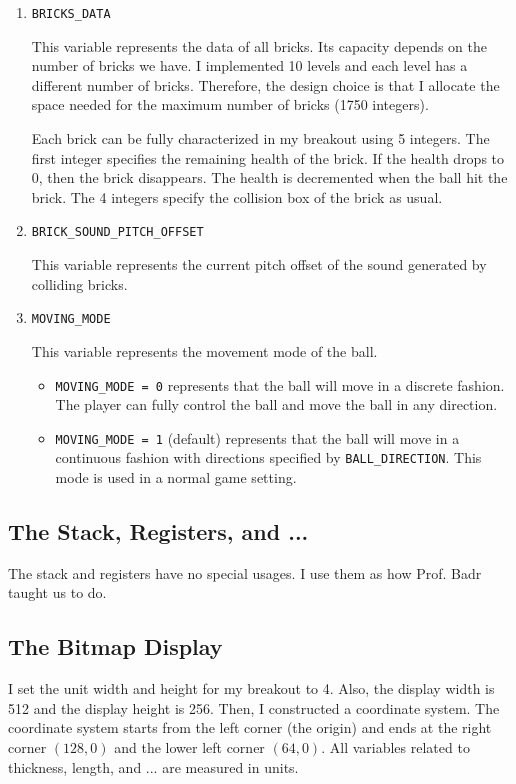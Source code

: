 \documentclass{article}
\newcommand{\code}[1]{\texttt{#1}}
\begin{document}
\begin{enumerate}
\item \code{BRICKS\_DATA}

This variable represents the data of all bricks. Its capacity depends on the number of bricks we have. I implemented 10 levels and each level has a different number of bricks. Therefore, the design choice is that I allocate the space needed for the maximum number of bricks (1750 integers).

Each brick can be fully characterized in my breakout using 5 integers. The first integer specifies the remaining health of the brick. If the health drops to 0, then the brick disappears. The health is decremented when the ball hit the brick. The 4 integers specify the collision box of the brick as usual.

\item \code{BRICK\_SOUND\_PITCH\_OFFSET}

This variable represents the current pitch offset of the sound generated by colliding bricks.

\item \code{MOVING\_MODE}

This variable represents the movement mode of the ball. 

\begin{itemize}
    \item \code{MOVING\_MODE = 0} represents that the ball will move in a discrete fashion. The player can fully control the ball and move the ball in any direction.
    \item \code{MOVING\_MODE = 1} (default) represents that the ball will move in a continuous fashion with directions specified by \code{BALL\_DIRECTION}. This mode is used in a normal game setting.
\end{itemize}

\end{enumerate}

\subsection{The Stack, Registers, and ...}

The stack and registers have no special usages. I use them as how Prof. Badr taught us to do.

\subsection{The Bitmap Display}

I set the unit width and height for my breakout to 4. Also, the display width is 512 and the display height is 256. Then, I constructed a coordinate system. The coordinate system starts from the left corner (the origin) and ends at the right corner $(128, 0)$ and the lower left corner $(64, 0)$. All variables related to thickness, length, and ... are measured in units.
\end{document}
